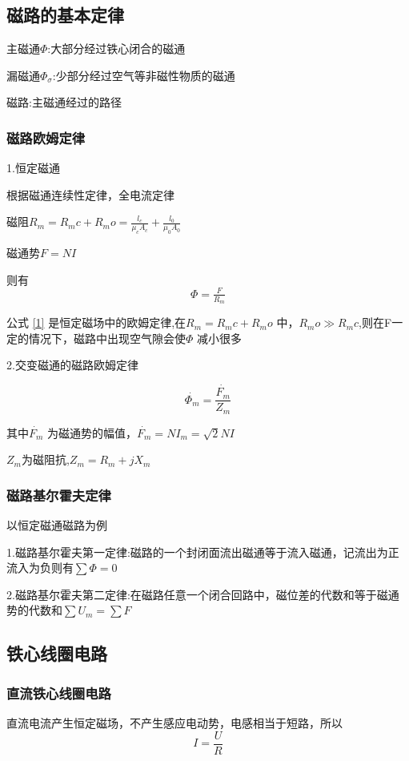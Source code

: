 \documentclass[11pt,twoside,a4paper]{ctexart}
\begin{document}
    \subsection{磁路的基本定律}
    主磁通$\varPhi $:大部分经过铁心闭合的磁通

    漏磁通$\varPhi _\sigma   $:少部分经过空气等非磁性物质的磁通

    磁路:主磁通经过的路径
    \subsubsection{磁路欧姆定律}
    1.恒定磁通

    根据磁通连续性定律，全电流定律

    磁阻$R_m = R_mc + R_mo = \frac{l_c}{\mu _cA_c} + \frac{l_0}{\mu _0A_0} $

    磁通势$F = NI $

    则有
    \begin{equation}
        \varPhi  = \tfrac{F}{R_m}\label{1}
    \end{equation}

    公式 \eqref{1} 是恒定磁场中的欧姆定律,在$R_m = R_mc + R_mo $ 中，$R_mo \gg R_mc $,则在F一定的情况下，磁路中出现空气隙会使$\varPhi $ 减小很多

    2.交变磁通的磁路欧姆定律

    \[ \dot{\varPhi_m } = \frac{\dot{F_m}}{Z_m} \]

    其中$\dot{F_m} $ 为磁通势的幅值，$\dot{F_m} = NI_m = \sqrt{2}NI  $

    $Z_m $为磁阻抗,$Z_m = R_m + jX_m $

    \subsubsection{磁路基尔霍夫定律}
    以恒定磁通磁路为例
    
    1.磁路基尔霍夫第一定律:磁路的一个封闭面流出磁通等于流入磁通，记流出为正流入为负则有$\sum \varPhi = 0 $

    2.磁路基尔霍夫第二定律:在磁路任意一个闭合回路中，磁位差的代数和等于磁通势的代数和$\sum U_m = \sum F $
    \subsection{铁心线圈电路}
    \subsubsection{直流铁心线圈电路}
    直流电流产生恒定磁场，不产生感应电动势，电感相当于短路，所以
    \[I = \frac{U}{R} \]
\end{document}

